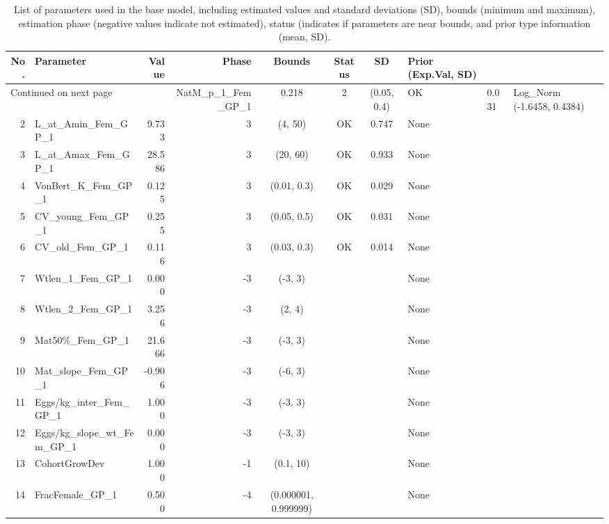\documentclass[12pt,]{article}
\begin{document}
\begin{landscape}
\begin{longtable}{rlrrcccl}
\caption{List of parameters used in
                                              the base model, including estimated 
                                              values and standard deviations (SD), 
                                              bounds (minimum and maximum), 
                                              estimation phase (negative values indicate
                                              not estimated), status (indicates if 
                                              parameters are near bounds, and prior type
                                              information (mean, SD).} \\ 
  \hline
No. & Parameter & Value & Phase & Bounds & Status & SD & Prior (Exp.Val, SD)  \\ 
  \hline 
\endhead 
\hline 
\multicolumn{3}{l}{\footnotesize Continued on next page} 
\endfoot 
\endlastfoot 
 \hline
1 & NatM\_p\_1\_Fem\_GP\_1 & 0.218 & 2 & (0.05, 0.4) & OK & 0.031 & Log\_Norm (-1.6458, 0.4384) \\ 
  2 & L\_at\_Amin\_Fem\_GP\_1 & 9.733 & 3 & (4, 50) & OK & 0.747 & None \\ 
  3 & L\_at\_Amax\_Fem\_GP\_1 & 28.586 & 3 & (20, 60) & OK & 0.933 & None \\ 
  4 & VonBert\_K\_Fem\_GP\_1 & 0.125 & 3 & (0.01, 0.3) & OK & 0.029 & None \\ 
  5 & CV\_young\_Fem\_GP\_1 & 0.255 & 3 & (0.05, 0.5) & OK & 0.031 & None \\ 
  6 & CV\_old\_Fem\_GP\_1 & 0.116 & 3 & (0.03, 0.3) & OK & 0.014 & None \\ 
  7 & Wtlen\_1\_Fem\_GP\_1 & 0.000 & -3 & (-3, 3) &  &  & None \\ 
  8 & Wtlen\_2\_Fem\_GP\_1 & 3.256 & -3 & (2, 4) &  &  & None \\ 
  9 & Mat50\%\_Fem\_GP\_1 & 21.666 & -3 & (-3, 3) &  &  & None \\ 
  10 & Mat\_slope\_Fem\_GP\_1 & -0.906 & -3 & (-6, 3) &  &  & None \\ 
  11 & Eggs/kg\_inter\_Fem\_GP\_1 & 1.000 & -3 & (-3, 3) &  &  & None \\ 
  12 & Eggs/kg\_slope\_wt\_Fem\_GP\_1 & 0.000 & -3 & (-3, 3) &  &  & None \\ 
  13 & CohortGrowDev & 1.000 & -1 & (0.1, 10) &  &  & None \\ 
  14 & FracFemale\_GP\_1 & 0.500 & -4 & (0.000001, 0.999999) &  &  & None \\ 

\end{longtable}
\end{landscape}
\end{document}
